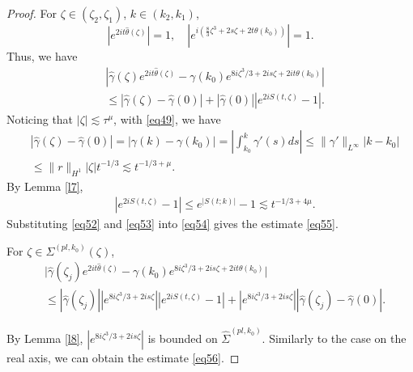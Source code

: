 \documentclass[11pt]{article}
\numberwithin{equation}{section}
\begin{document}
\begin{proof}
For   $\zeta\in (\zeta_2, \zeta_1)$, $k \in \left(k_2, k_1\right)$,
$$\left|  e^{2i t   \widehat\theta (\zeta) } \right|=1, \quad \left| e^{  i(\frac{8}{3} \zeta^3+ 2s \zeta+2t\theta(k_0))  } \right|=1.$$
  Thus,  we have
\begin{align}\label{eq54}
&\left| \widehat\gamma\left(\zeta\right)   e^{2it\widehat\theta \left(\zeta\right)}- \gamma(k_0)   e^{8i\zeta^3/3+2is\zeta+2it\theta(k_0) }   \right| \nonumber\\
&\leqslant \left|  \widehat\gamma (\zeta) - \widehat\gamma\left(0\right) \right|
+ \left|\widehat \gamma\left(0\right)   \right|       \left|   e^{2iS(t,\zeta)}-   1  \right|.
 \end{align}
 Noticing that $|\zeta|\lesssim \tau^\mu$,  with \eqref{eq49}, we have
  \begin{align}\label{eq52}
& \left|\widehat\gamma (\zeta) - \widehat\gamma (0)  \right|=\left|\gamma (k) - \gamma (k_0)  \right|=     \left|\int_{k_0}^{k} \gamma'(s) ds
    \right| \leqslant \|\gamma' \|_{L^\infty } |k-k_0| \nonumber\\
    &  \leqslant  \|r \|_{H^1} |\zeta|    t^{-1/3}  \lesssim t^{-1/3+\mu}.
 \end{align}
By Lemma \ref{l7},
  \begin{align}\label{eq53}
&  \left|   e^{2iS(t,\zeta)}-   1  \right| \leq e^{|S(t;k)|}- 1   \lesssim  t^{-1/3+4\mu}.
 \end{align}
 Substituting \eqref{eq52} and \eqref{eq53} into \eqref{eq54} gives the estimate  \eqref{eq55}.


For $\zeta \in  \Sigma^{(pl,k_0)}(\zeta)$,
\begin{align*}
   & \Big| \widehat\gamma \left(\zeta_j \right)   e^{2it\widehat\theta \left(\zeta\right)}- \gamma(k_0) e^{8i\zeta^3/3+2is\zeta+2it\theta(k_0) }  \Big| \nonumber\\
   &\leqslant \left|\widehat\gamma \left(\zeta_j \right) \right| \left| e^{8i\zeta^3/3+2is\zeta} \right|\left| e^{2iS(t,\zeta)}-1\right| \nonumber+ \left|e^{8i\zeta^3/3+2is\zeta} \right| \left| \widehat\gamma (\zeta_j) - \widehat\gamma (0) \right|.
\end{align*}


By Lemma \ref{l8}, $ \left| e^{8i\zeta^3/3+2is\zeta}\right|$ is bounded on $\widehat\Sigma^{(pl,k_0)}$.
Similarly to the case on the real axis, we can obtain the estimate \eqref{eq56}.

\end{proof}
\end{document}
